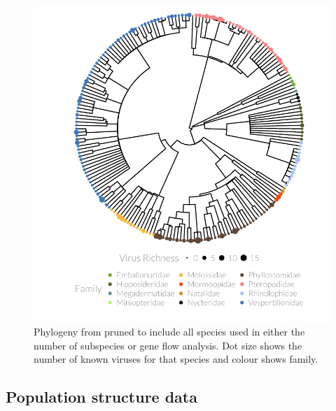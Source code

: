 \begin{knitrout}\footnotesize
{}\color{fgcolor}\begin{figure}[t]

{\centering \includegraphics[width=1\textwidth,trim = 0cm 0cm 0cm 0cm]{figure/treePlot-1} 

}

\caption[Pruned phylogeny with dot size showing number of pathogens and colour showing family.]{
Phylogeny from \cite{bininda2007delayed} pruned to include all species used in either the number of subspecies or gene flow analysis.
Dot size shows the number of known viruses for that species and colour shows family.
}\label{fig:treePlot}
\end{figure}


\end{knitrout}

\subsection{Population structure data}

